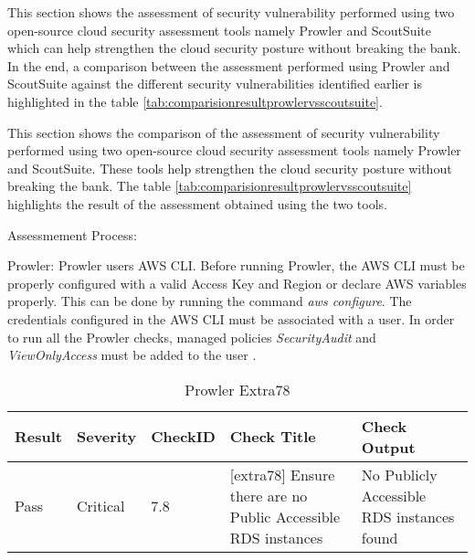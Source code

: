 \par This section shows the assessment of security vulnerability performed using two open-source cloud security assessment tools namely Prowler and ScoutSuite which can help strengthen the cloud security posture without breaking the bank.
In the end, a comparison between the assessment performed using Prowler and ScoutSuite against the different security vulnerabilities identified earlier is highlighted in the table \ref{tab:comparisionresultprowlervsscoutsuite}.

\par This section shows the comparison of the assessment of security vulnerability performed using two open-source cloud security assessment tools namely Prowler and ScoutSuite.
These tools help strengthen the cloud security posture without breaking the bank.
The table \ref{tab:comparisionresultprowlervsscoutsuite} highlights the result of the assessment obtained using the two tools.

\par Assessmement Process:


\par Prowler: Prowler users AWS CLI. Before running Prowler, the AWS CLI must be properly configured with a valid Access Key and Region or declare AWS variables properly.
This can be done by running the command \textit{aws configure}.
The credentials configured in the AWS CLI must be associated with a user.
In order to run all the Prowler checks, managed policies \textit{SecurityAudit} and \textit{ViewOnlyAccess} must be added to the user \cite{75}.

\begin{table}[h!]
    \begin{center}
        \caption{Prowler Extra78}
        \label{tab:prowlerextra}
        \begin{tabular}{|p{1.4cm}|p{1.7cm}|p{1.5cm}|p{4.0cm}|p{5.0cm}|}
            \hline
            \textbf{Result} & \textbf{Severity} & \textbf{CheckID} & \textbf{Check Title} & \textbf{Check Output}\\
            \hline
            Pass & Critical & 7.8 & [extra78] Ensure there are no Public Accessible RDS instances &
            No Publicly Accessible RDS instances found\\
            \hline
        \end{tabular}
    \end{center}
\end{table}

